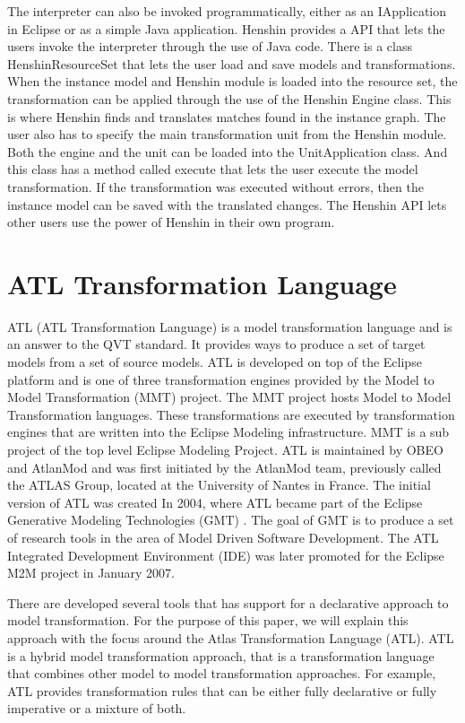 The interpreter can also be invoked programmatically, either as an IApplication
in Eclipse or as a simple Java application. Henshin provides a API that lets the
users invoke the interpreter through the use of Java code. There is a class
HenshinResourceSet that lets the user load and save models and transformations.
When the instance model and Henshin module is loaded into the resource set, the
transformation can be applied through the use of the Henshin Engine class. This
is where Henshin finds and translates matches found in the instance graph. The
user also has to specify the main transformation unit from the Henshin module.
Both the engine and the unit can be loaded into the UnitApplication class. And
this class has a method called execute that lets the user execute the model
transformation. If the transformation was executed without errors, then the
instance model can be saved with the translated changes. The Henshin API lets
other users use the power of Henshin in their own program.

\section{ATL Transformation Language}

ATL\cite{ATL} (ATL Transformation Language) is a model transformation
language and is an answer to the QVT\cite{QVT} standard. It
provides ways to produce a set of target models from a set of source models.
ATL is developed on top of the Eclipse platform and is one of three
transformation engines provided by the Model to Model Transformation (MMT)
project\cite{MMT}. The MMT project hosts Model to Model Transformation
languages. These transformations are executed by transformation engines that are
written into the Eclipse Modeling infrastructure. MMT is a sub project of the
top level Eclipse Modeling Project\cite{EMP}. ATL is maintained by
OBEO\cite{OBEO} and AtlanMod\cite{ATLANMod} and was first initiated by the
AtlanMod team, previously called the ATLAS Group, located at the University of
Nantes in France. The initial version of ATL was created In 2004, where ATL
became part of the Eclipse Generative Modeling Technologies (GMT) \cite{GMT}.
The goal of GMT is to produce a set of research tools in the area of Model
Driven Software Development. The ATL Integrated Development Environment (IDE)
was later promoted for the Eclipse M2M project in January 2007.

There are developed several tools that has support for a declarative
approach to model transformation. For the purpose of this paper, we will explain
this approach with the focus around the Atlas Transformation Language (ATL).
ATL is a hybrid model transformation approach, that is a transformation
language that combines other model to model transformation approaches. For
example, ATL provides transformation rules that can be either fully declarative
or fully imperative or a mixture of both. 

